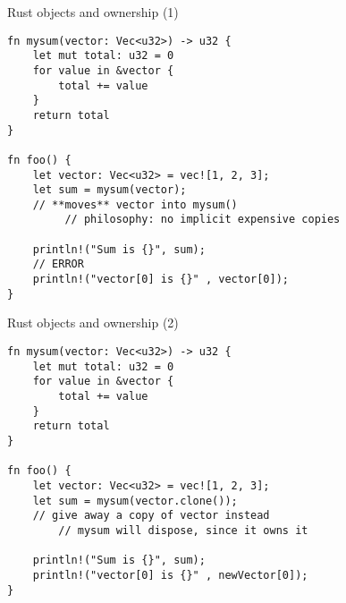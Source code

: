\begin{frame}[fragile,label=rustOwnership1]{Rust objects and ownership (1)}
    \begin{verbatim}
fn mysum(vector: Vec<u32>) -> u32 {
    let mut total: u32 = 0
    for value in &vector {
        total += value
    }
    return total
}

fn foo() {
    let vector: Vec<u32> = vec![1, 2, 3];
    let sum = mysum(vector);
    // **moves** vector into mysum()
         // philosophy: no implicit expensive copies
    
    println!("Sum is {}", sum);
    // ERROR
    println!("vector[0] is {}" , vector[0]);
}
\end{verbatim}
\end{frame}

\begin{frame}[fragile,label=rustOwnership2]{Rust objects and ownership (2)}
    \begin{verbatim}
fn mysum(vector: Vec<u32>) -> u32 {
    let mut total: u32 = 0
    for value in &vector {
        total += value
    }
    return total
}

fn foo() {
    let vector: Vec<u32> = vec![1, 2, 3];
    let sum = mysum(vector.clone());
    // give away a copy of vector instead
        // mysum will dispose, since it owns it
    
    println!("Sum is {}", sum);
    println!("vector[0] is {}" , newVector[0]);
}
\end{verbatim}
\end{frame}

